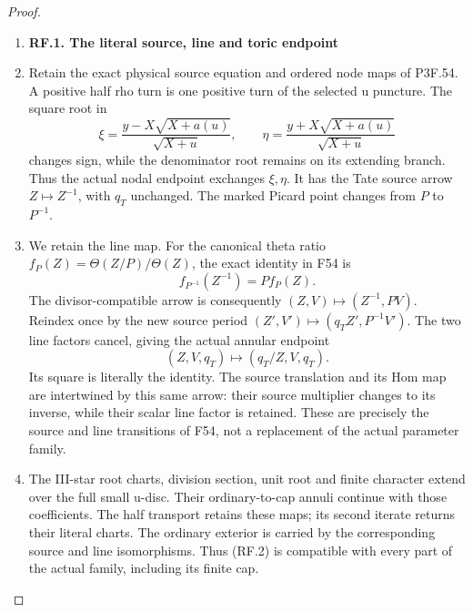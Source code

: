 \begin{proof}
\begin{enumerate}[label=\arabic*.]
\item \par

\medskip\noindent\textbf{RF.1. The literal source, line and toric endpoint}

\par\nobreak

\item Retain the exact physical source equation and ordered node maps of
P3F.54. A positive half rho turn is one positive turn of the selected
u puncture. The square root in
\[
 \xi=\frac{y-X\sqrt{X+a(u)}}{\sqrt{X+u}},\qquad
 \eta=\frac{y+X\sqrt{X+a(u)}}{\sqrt{X+u}}
\]
changes sign, while the denominator root remains on its extending
branch. Thus the actual nodal endpoint exchanges \(\xi,\eta\).
It has the Tate source arrow \(Z\mapsto Z^{-1}\), with \(q_T\)
unchanged. The marked Picard point changes from \(P\) to
\(P^{-1}\).

\item We retain the line map. For the canonical theta ratio
\(f_P(Z)=\Theta(Z/P)/\Theta(Z)\), the exact identity in F54 is
\[
                   f_{P^{-1}}(Z^{-1})=P f_P(Z).
                                                               \tag{RF.1}
\]
The divisor-compatible arrow is consequently
\((Z,V)\mapsto(Z^{-1},PV)\). Reindex once by the new source
period \((Z',V')\mapsto(q_TZ',P^{-1}V')\). The two line factors
cancel, giving the actual annular endpoint
\[
                   (Z,V,q_T)\longmapsto(q_T/Z,V,q_T).
                                                               \tag{RF.2}
\]
Its square is literally the identity. The source translation and
its Hom map are intertwined by this same arrow: their source
multiplier changes to its inverse, while their scalar line factor
is retained. These are precisely the source and line transitions
of F54, not a replacement of the actual parameter family.

\item The III-star root charts, division section, unit root and finite
character extend over the full small u-disc. Their ordinary-to-cap
annuli continue with those coefficients. The half transport retains
these maps; its second iterate returns their literal charts. The
ordinary exterior is carried by the corresponding source and line
isomorphisms. Thus (RF.2) is compatible with every part of the actual
family, including its finite cap.


\end{enumerate}
\end{proof}
